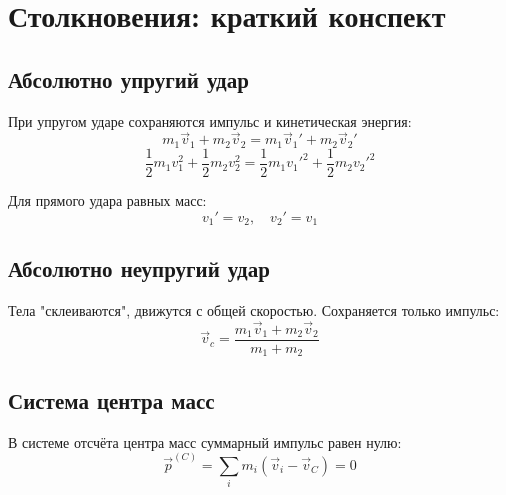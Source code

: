 \documentclass{article}
\begin{document}
\section*{Столкновения: краткий конспект}

\subsection*{Абсолютно упругий удар}
При упругом ударе сохраняются импульс и кинетическая энергия:
\[
m_1\vec v_{1}+m_2\vec v_{2}=m_1\vec v_{1}'+m_2\vec v_{2}'
\]
\[
\frac12m_1v_{1}^2+\frac12m_2v_{2}^2=\frac12m_1{v_{1}'}^2+\frac12m_2{v_{2}'}^2
\]

Для прямого удара равных масс:
\[
v_{1}'=v_{2},\quad v_{2}'=v_{1}
\]

\subsection*{Абсолютно неупругий удар}
Тела "склеиваются", движутся с общей скоростью. Сохраняется только импульс:
\[
\vec v_c=\frac{m_1\vec v_{1}+m_2\vec v_{2}}{m_1+m_2}
\]

\subsection*{Система центра масс}
В системе отсчёта центра масс суммарный импульс равен нулю:
\[
\vec p^{(C)} = \sum_im_i(\vec v_i - \vec v_C) = 0
\]
\end{document}
